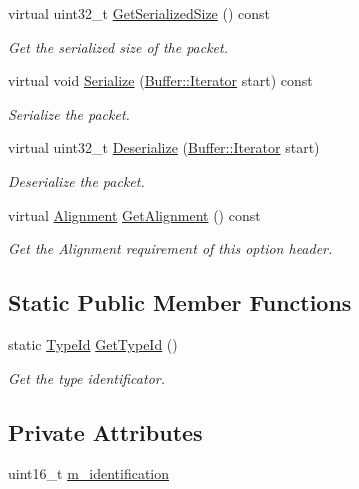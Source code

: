 \begin{DoxyCompactItemize}
virtual uint32\+\_\+t \hyperlink{classns3_1_1dsr_1_1DsrOptionAckReqHeader_a8062e37d55e439263678dba3a8663869}{Get\+Serialized\+Size} () const 
\begin{DoxyCompactList}\small\item\em Get the serialized size of the packet. \end{DoxyCompactList}\item 
virtual void \hyperlink{classns3_1_1dsr_1_1DsrOptionAckReqHeader_ae743c5267313ec4423a92e3ed8e81c63}{Serialize} (\hyperlink{classns3_1_1Buffer_1_1Iterator}{Buffer\+::\+Iterator} start) const 
\begin{DoxyCompactList}\small\item\em Serialize the packet. \end{DoxyCompactList}\item 
virtual uint32\+\_\+t \hyperlink{classns3_1_1dsr_1_1DsrOptionAckReqHeader_a5c7c9641d41346faf881a4d7df0f36c7}{Deserialize} (\hyperlink{classns3_1_1Buffer_1_1Iterator}{Buffer\+::\+Iterator} start)
\begin{DoxyCompactList}\small\item\em Deserialize the packet. \end{DoxyCompactList}\item 
virtual \hyperlink{structns3_1_1dsr_1_1DsrOptionHeader_1_1Alignment}{Alignment} \hyperlink{classns3_1_1dsr_1_1DsrOptionAckReqHeader_a1f439e65f50312fecc4809f3cb0e274d}{Get\+Alignment} () const 
\begin{DoxyCompactList}\small\item\em Get the Alignment requirement of this option header. \end{DoxyCompactList}\end{DoxyCompactItemize}
\subsection*{Static Public Member Functions}
\begin{DoxyCompactItemize}
\item 
static \hyperlink{classns3_1_1TypeId}{Type\+Id} \hyperlink{classns3_1_1dsr_1_1DsrOptionAckReqHeader_af5a3cdbef601051fae92e50919db3ba1}{Get\+Type\+Id} ()
\begin{DoxyCompactList}\small\item\em Get the type identificator. \end{DoxyCompactList}\end{DoxyCompactItemize}
\subsection*{Private Attributes}
\begin{DoxyCompactItemize}
\item 
uint16\+\_\+t \hyperlink{classns3_1_1dsr_1_1DsrOptionAckReqHeader_a8f6da6c8ab15765a7334668585e977b6}{m\+\_\+identification}
\end{DoxyCompactItemize}
